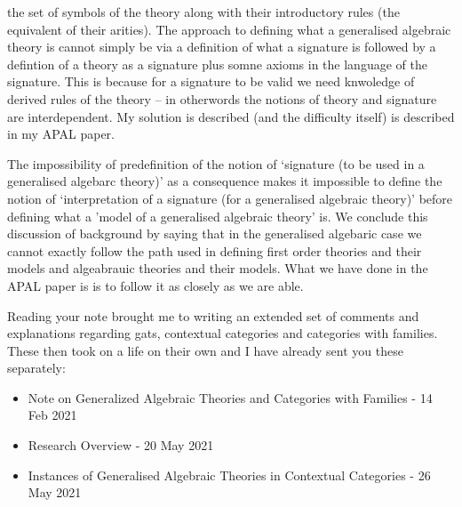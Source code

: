 the set of symbols of the theory along with their introductory rules (the equivalent of their arities). 
The approach to defining what a generalised algebraic theory is cannot simply be via a definition of what a signature is followed by a defintion 
of a theory as a signature plus somne axioms in the language of the signature. This is because for a signature to be valid we need knwoledge of derived rules of the theory -- in otherwords the notions of theory and signature are interdependent. My solution is described (and the difficulty itself) 
is described in my APAL paper. 

\note The impossibility of predefinition of the notion of `signature (to be used in a generalised algebarc theory)' as a consequence
makes it impossible to define the notion of `interpretation of a signature (for a generalised algebraic theory)' before defining what a 'model of a generalised algebraic theory' is. 
\note 
We conclude this discussion of background by saying that in the generalised algebaric case we cannot exactly follow the path used in defining 
first order theories and their models and algeabrauic theories and their models. What we have done in the APAL paper is is to follow it as closely as we are able. 
\note

\note
Reading your note brought me to writing  an extended set of comments and explanations regarding gats, contextual categories and categories with families.
These then took on a life on their own and I have already sent you these separately:
\begin{itemize}
\item Note on Generalized Algebraic Theories and Categories with Families - 14 Feb 2021
\item Research Overview - 20 May 2021
\item Instances of Generalised Algebraic Theories in Contextual Categories - 26 May 2021
\end{itemize}

